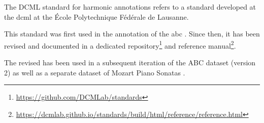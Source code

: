 

The DCML standard for harmonic annotations refers to a
standard developed at the \gls{dcml} at the \'Ecole
Polytechnique F\'ed\'erale de Lausanne.

This standard was first used in the annotation of the
\gls{abc}
\parencite{neuwirth2018annotated}. Since then, it has been
revised and documented in a dedicated
repository\footnote{\href{https://github.com/DCMLab/standards}{https://github.com/DCMLab/standards}}
and reference
manual\footnote{\href{https://dcmlab.github.io/standards/build/html/reference/reference.html}{https://dcmlab.github.io/standards/build/html/reference/reference.html}}.

The revised has been used in a subsequent iteration of the
ABC dataset (version 2) as well as a separate dataset of
Mozart Piano Sonatas \parencite{hentschel2021annotated}.
